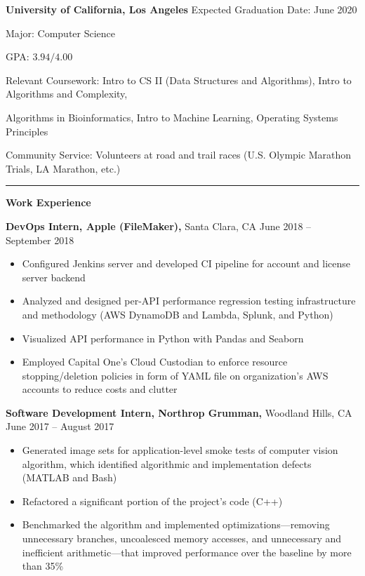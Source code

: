 \documentclass[11pt]{article}
\begin{document}
\textbf{University of California, Los Angeles} \hfill Expected Graduation Date: June 2020 \setlength{\parindent}{3em}\par
Major: Computer Science\par
GPA: $3.94/4.00$ \par
Relevant Coursework: Intro to CS II (Data Structures and Algorithms), Intro to Algorithms and Complexity, \setlength{\parindent}{4.5em}\par Algorithms in Bioinformatics, Intro to Machine Learning, Operating Systems Principles\setlength{\parindent}{3em}\par
Community Service: Volunteers at road and trail races (U.S. Olympic Marathon Trials, LA Marathon, etc.)\vspace{6pt}\setlength{\parindent}{0 em}\par
\rule[10pt]{\textwidth}{.75pt} \vspace{-20pt}
\setlength{\parindent}{0.55em}\par
\textbf{\Large Work Experience} \vspace{4pt}
\setlength{\parindent}{1.5em}\par
\textbf{DevOps Intern, Apple (FileMaker),} Santa Clara, CA \hfill June 2018 -- September 2018 \vspace{-6pt} \setlength{\parindent}{3em}\par
\begin{itemize}[leftmargin=15.2mm]
	\setlength\itemsep{-.4em}
	\item Configured Jenkins server and developed CI pipeline for account and license server backend
	\item Analyzed and designed per-API performance regression testing infrastructure and methodology (AWS DynamoDB and Lambda, Splunk, and Python)
	\item Visualized API performance in Python with Pandas and Seaborn 
	\item Employed Capital One's Cloud Custodian to enforce resource stopping/deletion policies in form of YAML file on organization's AWS accounts to reduce costs and clutter
\end{itemize} \setlength{\parindent}{1.5em}\par \vspace{-6pt}
\textbf{Software Development Intern, Northrop Grumman,} Woodland Hills, CA \hfill June 2017 -- August 2017 \vspace{-6pt} \setlength{\parindent}{3em}\par
\begin{itemize}[leftmargin=15.2mm]
	\setlength\itemsep{-.4em}
	\item Generated image sets for application-level smoke tests of computer vision algorithm, which identified algorithmic and implementation defects (MATLAB and Bash)
	\item Refactored a significant portion of the project's code (C++)
	\item Benchmarked the algorithm and implemented optimizations---removing unnecessary branches, uncoalesced memory accesses, and unnecessary and inefficient arithmetic---that improved performance over the baseline by more than 35\%
\end{itemize}
\end{document}
